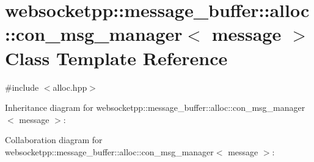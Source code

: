 \hypertarget{classwebsocketpp_1_1message__buffer_1_1alloc_1_1con__msg__manager}{}\section{websocketpp\+:\+:message\+\_\+buffer\+:\+:alloc\+:\+:con\+\_\+msg\+\_\+manager$<$ message $>$ Class Template Reference}
\label{classwebsocketpp_1_1message__buffer_1_1alloc_1_1con__msg__manager}


{\ttfamily \#include $<$alloc.\+hpp$>$}



Inheritance diagram for websocketpp\+:\+:message\+\_\+buffer\+:\+:alloc\+:\+:con\+\_\+msg\+\_\+manager$<$ message $>$\+:


Collaboration diagram for websocketpp\+:\+:message\+\_\+buffer\+:\+:alloc\+:\+:con\+\_\+msg\+\_\+manager$<$ message $>$\+:
